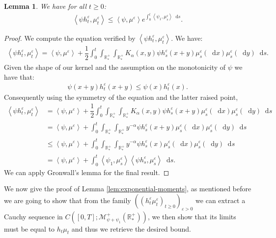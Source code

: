 \documentclass[11pt,a4paper]{article}
\newcommand{\RRP}{\mathbb{R}^+_*}
\newcommand{\MC}{\mathcal{M}}
\newcommand{\Proc}[1]{\left(#1\right)_{t\geq 0}}
\newcommand{\brac}[1]{\left\langle#1\right\rangle}
\newcommand{\dd}{\mathop{}\!\mathrm{d}}
\newtheorem{lemma}[theorem]{Lemma}
\begin{document}
\begin{lemma}\label{lem:exponential-moments-epsilon}
    We have for all $t \geq 0$:
    \begin{align*}
        \brac{\psi h^\varepsilon_t,\mu^\varepsilon_t} \leq \brac{\psi,\mu^\varepsilon}e^{\int_0^t \brac{\psi_1,\mu^\varepsilon_s}\dd s} .
    \end{align*}
\end{lemma}
\begin{proof}
    We compute the equation verified by $\brac{\psi h^\varepsilon_t,\mu^\varepsilon_t}$. We have:
    \begin{align*}
        \brac{\psi h^\varepsilon_t,\mu^\varepsilon_t} = \brac{\psi,\mu^\varepsilon} + \dfrac12\int_0^t \int_{\RRP}\int_{\RRP} K_\alpha(x,y) \psi h^\varepsilon_s(x+y)\mu^\varepsilon_s(\dd x)\mu^\varepsilon_s(\dd y)  \dd s.
    \end{align*}
    Given the shape of our kernel and the assumption on the monotonicity of $\psi$ we have that:
    \begin{align*}
        \psi(x+y) h^\varepsilon_t(x+y) \leq \psi(x)h^\varepsilon_t(x).
    \end{align*}
    Consequently using the symmetry of the equation and the latter raised point,
    \begin{align*}
        \brac{\psi h^\varepsilon_t,\mu^\varepsilon_t} &= \brac{\psi,\mu^\varepsilon} + \dfrac12\int_0^t \int_{\RRP}\int_{\RRP} K_\alpha(x,y) \psi h^\varepsilon_s(x+y)\mu^\varepsilon_s(\dd x)\mu^\varepsilon_s(\dd y)  \dd s \\
        &= \brac{\psi,\mu^\varepsilon} + \int_0^t \int_{\RRP}\int_{\RRP} y^{-\alpha} \psi h^\varepsilon_s(x+y)\mu^\varepsilon_s(\dd x)\mu^\varepsilon_s(\dd y)  \dd s \\
        &\leq \brac{\psi,\mu^\varepsilon} + \int_0^t \int_{\RRP}\int_{\RRP} y^{-\alpha} \psi h^\varepsilon_s(x)\mu^\varepsilon_s(\dd x)\mu^\varepsilon_s(\dd y)  \dd s \\
        &= \brac{\psi,\mu^\varepsilon} + \int_0^t \brac{\psi_1,\mu^\varepsilon_s} \brac{\psi h^\varepsilon_s,\mu^\varepsilon_s}\dd s.
    \end{align*}
    We can apply Gronwall's lemma for the final result.
\end{proof}
We now give the proof of Lemma \ref{lem:exponential-moments}, as mentioned before we are going to show that from the family $\left( \Proc{h_t^\varepsilon\mu^\varepsilon_t}\right)_{\varepsilon > 0}$ we can extract a Cauchy sequence in $C\left([0,T];\MC^+_{\psi + \psi_1}(\RRP)\right)$, we then show that its limits must be equal to $h_t\mu_t$ and thus we retrieve the desired bound.
\end{document}
